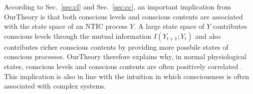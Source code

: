 \documentclass[utf8]{article}
\begin{document}
    	    
    	    According to Sec.~\ref{sec:cl} and Sec.~\ref{sec:cc}, an important implication from \ac{OurTheory} is that both conscious levels and conscious contents are associated with the state space of an NTIC process $Y$. A large state space of $Y$ contributes conscious levels through the mutual information $I(Y_{t+1};Y_{t})$ and also contributes richer conscious contents by providing more possbile states of conscious processes. 
    	    \ac{OurTheory} therefore explains why, in normal physiological states, conscious levels and conscious contents are often positively correlated \citep{laureys2005neural}. This implication is also in line with the intuition in which consciousness is often associated with complex systems.
    			
    
    
\end{document}

